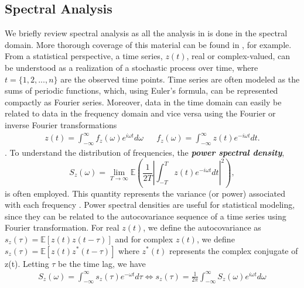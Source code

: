 \documentclass{stat572Style}
\begin{document}
	\subsection{Spectral Analysis}
	\label{sec: specAnalysis}
	\indent We briefly review spectral analysis as all the analysis in \citet{Sykulski2016} is done in the spectral domain.   
	More thorough coverage of this material can be found in  \citet{Percival1993}, for example. 
	From a statistical perspective, a time series, $z(t)$, real or complex-valued,  can be understood as a realization of a stochastic process over time, where  $t = \{1,2,...,n\}$ are the observed time points.  
	Time series are often modeled as the sums of periodic functions, which, using Euler's formula, can be represented compactly as Fourier series. 
	Moreover, data in the time domain can easily be related to data in the frequency domain and vice versa using the Fourier or inverse Fourier transformations 	\begin{align}
z(t) = \int_{-\infty}^{\infty} f_{z}(\omega)e^{i\omega t}d\omega && f_{z}(\omega) = \int_{-\infty}^{\infty} z(t) e^{-i \omega t }dt.
\end{align}
\citep{Percival1993}. 
To understand the distribution of frequencies, the \textbf{\it{power spectral density}},
\begin{equation}
S_{z}(\omega) = \underset{T \rightarrow \infty}{\lim} \mathbb{E} \left(\frac{1}{2T} \left| \int_{-T}^{T} z(t) e^{-i \omega t}dt \right|^{2} \right),
\end{equation}
is often employed. 
This quantity represents the variance (or power) associated with each frequency \citep{Percival1993}. 
Power spectral densities are useful for statistical modeling, since they can be related to the autocovariance sequence of a time series using  Fourier transformation.  
For real $z(t)$, we define the autocovariance as $s_{z}(\tau) = \mathbb{E}[z(t) z(t - \tau)] $ and for complex $z(t)$, we define $s_{z}(\tau) = \mathbb{E}[z(t) z^{*}(t - \tau)] $ where $z^{*}(t)$ represents the complex conjugate of z(t). Letting $\tau$ be the time lag, we have
\begin{align}
\label{eq: fourierPair}
S_{z}(\omega) = \int_{-\infty}^{\infty}s_{z}(\tau) e^{-\omega t}d \tau \Longleftrightarrow s_{z}(\tau) = \frac{1}{2\pi} \int_{-\infty}^{\infty}S_{z}(\omega) e^{i \omega t} d\omega 
\end{align}
\end{document}
